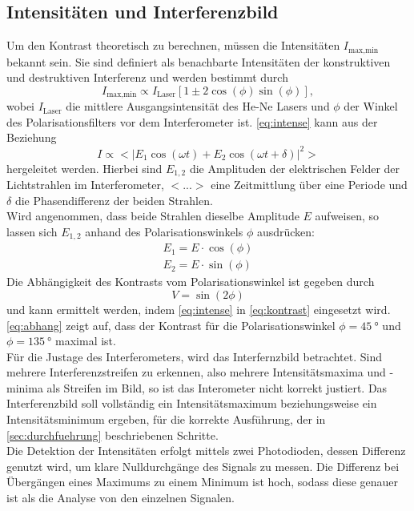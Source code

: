 \subsection{Intensitäten und Interferenzbild}
Um den Kontrast theoretisch zu berechnen, müssen die Intensitäten $I_{\text{max,min}}$ bekannt sein.
Sie sind definiert als benachbarte Intensitäten der konstruktiven und destruktiven Interferenz und werden bestimmt durch
\begin{equation}
    I_{\text{max,min}} \propto I_{\text{Laser}}\left[1 \pm 2\cos\left(\phi\right)\sin\left(\phi\right)\right],
    \label{eq:intense}
\end{equation}
wobei $I_{\text{Laser}}$ die mittlere Ausgangsintensität des He-Ne Lasers und $\phi$ der Winkel des Polarisationsfilters vor dem Interferometer ist.
\autoref{eq:intense} kann aus der Beziehung
\begin{equation}
    I \propto <|E_1\cos\left(\omega t\right) + E_2\cos\left(\omega t + \delta\right)|^2>
\end{equation}
hergeleitet werden.
Hierbei sind $E_{1,2}$ die Amplituden der elektrischen Felder der Lichtstrahlen im Interferometer, $<...>$ eine Zeitmittlung über eine Periode und $\delta$ die Phasendifferenz der beiden Strahlen.\\
Wird angenommen, dass beide Strahlen dieselbe Amplitude $E$ aufweisen, so lassen sich $E_{1,2}$ anhand des Polarisationswinkels $\phi$ ausdrücken:
\begin{align}
    E_1 = E\cdot \cos\left(\phi\right)\\
    E_2 = E\cdot \sin\left(\phi\right)
\end{align}
Die Abhängigkeit des Kontrasts vom Polarisationswinkel ist gegeben durch
\begin{equation}
    V = \sin\left(2\phi\right)
    \label{eq:abhang}
\end{equation}
und kann ermittelt werden, indem \autoref{eq:intense} in \autoref{eq:kontrast} eingesetzt wird.\\
\autoref{eq:abhang} zeigt auf, dass der Kontrast für die Polarisationswinkel $\phi = \SI{45}{\degree}$ und $\phi = \SI{135}{\degree}$ maximal ist.\\
\newline
Für die Justage des Interferometers, wird das Interfernzbild betrachtet.
Sind mehrere Interferenzstreifen zu erkennen, also mehrere Intensitätsmaxima und -minima als Streifen im Bild, so ist das Interometer nicht korrekt justiert.
Das Interferenzbild soll vollständig ein Intensitätsmaximum beziehungsweise ein Intensitätsminimum ergeben, für die korrekte Ausführung, der in \autoref{sec:durchfuehrung} beschriebenen Schritte.\\
Die Detektion der Intensitäten erfolgt mittels zwei Photodioden, dessen Differenz genutzt wird, um klare Nulldurchgänge des Signals zu messen.
Die Differenz bei Übergängen eines Maximums zu einem Minimum ist hoch, sodass diese genauer ist als die Analyse von den einzelnen Signalen.

